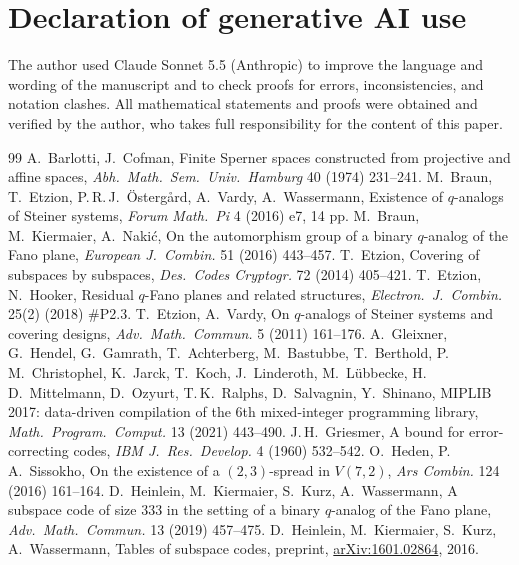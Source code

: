 \documentclass[11pt]{amsart}
\theoremstyle{definition}
\begin{document}
\section*{Declaration of generative AI use}
The author used Claude Sonnet 5.5 (Anthropic) to improve the language and wording of the manuscript and to check proofs for errors, inconsistencies, and notation clashes. All mathematical statements and proofs were obtained and verified by the author, who takes full responsibility for the content of this paper.

\begin{thebibliography}{99}
 A.~Barlotti, J.~Cofman, Finite Sperner spaces constructed from projective and affine spaces, \emph{Abh.\ Math.\ Sem.\ Univ.\ Hamburg} 40 (1974) 231--241.
 M.~Braun, T.~Etzion, P.\,R.\,J.~\"Osterg\aa rd, A.~Vardy, A.~Wassermann, Existence of $q$-analogs of Steiner systems, \emph{Forum Math.\ Pi} 4 (2016) e7, 14 pp.
 M.~Braun, M.~Kiermaier, A.~Naki\'c, On the automorphism group of a binary $q$-analog of the Fano plane, \emph{European J.\ Combin.} 51 (2016) 443--457.
 T.~Etzion, Covering of subspaces by subspaces, \emph{Des.\ Codes Cryptogr.} 72 (2014) 405--421.
 T.~Etzion, N.~Hooker, Residual $q$-Fano planes and related structures, \emph{Electron.\ J.\ Combin.} 25(2) (2018) \#P2.3.
 T.~Etzion, A.~Vardy, On $q$-analogs of Steiner systems and covering designs, \emph{Adv.\ Math.\ Commun.} 5 (2011) 161--176.
 A.~Gleixner, G.~Hendel, G.~Gamrath, T.~Achterberg, M.~Bastubbe, T.~Berthold, P.\,M.~Christophel, K.~Jarck, T.~Koch, J.~Linderoth, M.~L\"ubbecke, H.\,D.~Mittelmann, D.~Ozyurt, T.\,K.~Ralphs, D.~Salvagnin, Y.~Shinano, MIPLIB 2017: data-driven compilation of the 6th mixed-integer programming library, \emph{Math.\ Program.\ Comput.} 13 (2021) 443--490.
 J.\,H.~Griesmer, A bound for error-correcting codes, \emph{IBM J.\ Res.\ Develop.} 4 (1960) 532--542.
 O.~Heden, P.\,A.~Sissokho, On the existence of a $(2,3)$-spread in $V(7,2)$, \emph{Ars Combin.} 124 (2016) 161--164.
 D.~Heinlein, M.~Kiermaier, S.~Kurz, A.~Wassermann, A subspace code of size $333$ in the setting of a binary $q$-analog of the Fano plane, \emph{Adv.\ Math.\ Commun.} 13 (2019) 457--475.
 D.~Heinlein, M.~Kiermaier, S.~Kurz, A.~Wassermann, Tables of subspace codes, preprint, \href{https://arxiv.org/abs/1601.02864}{arXiv:1601.02864}, 2016.

\end{thebibliography}
\end{document}
